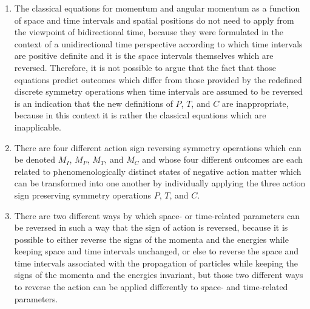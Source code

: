 \documentclass[notitlepage,12pt]{report}
\begin{document}
\begin{enumerate}
\item The classical equations for momentum and angular momentum as a function of space and time intervals and spatial positions do not need to apply from the viewpoint of bidirectional time, because they were formulated in the context of a unidirectional time perspective according to which time intervals are positive definite and it is the space intervals themselves which are reversed. Therefore, it is not possible to argue that the fact that those equations predict outcomes which differ from those provided by the redefined discrete symmetry operations when time intervals are assumed to be reversed is an indication that the new definitions of $P$, $T$, and $C$ are inappropriate, because in this context it is rather the classical equations which are inapplicable.

\item There are four different action sign reversing symmetry operations which can be denoted $M_I$, $M_P$, $M_T$, and $M_C$ and whose four different outcomes are each related to phenomenologically distinct states of negative action matter which can be transformed into one another by individually applying the three action sign preserving symmetry operations $P$, $T$, and $C$.

\item There are two different ways by which space- or time-related parameters can be reversed in such a way that the sign of action is reversed, because it is possible to either reverse the signs of the momenta and the energies while keeping space and time intervals unchanged, or else to reverse the space and time intervals associated with the propagation of particles while keeping the signs of the momenta and the energies invariant, but those two different ways to reverse the action can be applied differently to space- and time-related parameters.


\end{enumerate}
\end{document}
